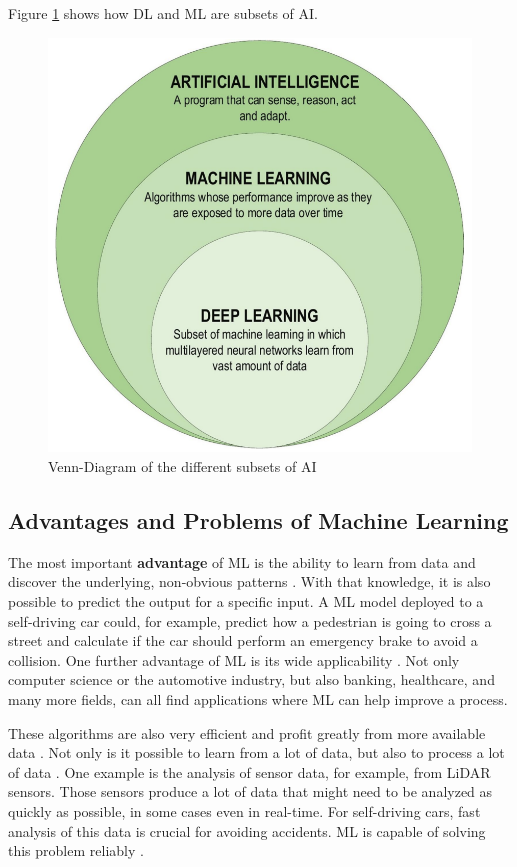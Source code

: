 Figure \ref{fig:AIMLDL} shows how DL and ML are subsets of AI. 

\begin{figure}[H]
	\centering
	\includegraphics[width=0.7\linewidth]{IMGs/AIMLDL.png}
	\caption{Venn-Diagram of the different subsets of AI \cite{Alzubaidi}}
	\label{fig:AIMLDL}
\end{figure}
\newpage
\subsection{Advantages and Problems of Machine Learning}\label{Advantages and Problems of Machine Learning}
The most important \textbf{advantage} of ML is the ability to learn from data and discover the underlying, non-obvious patterns \cite{Wuest}. With that knowledge, it is also possible to predict the output for a specific input. A ML model deployed to a self-driving car could, for example, predict how a pedestrian is going to cross a street and calculate if the car should perform an emergency brake to avoid a collision. One further advantage of ML is its wide applicability \cite{Thommandru}. Not only computer science or the automotive industry, but also banking, healthcare, and many more fields, can all find applications where ML can help improve a process.

These algorithms are also very efficient and profit greatly from more available data \cite{Janiesch}. Not only is it possible to learn from a lot of data, but also to process a lot of data \cite{Wuest}. One example is the analysis of sensor data, for example, from LiDAR sensors. Those sensors produce a lot of data that might need to be analyzed as quickly as possible, in some cases even in real-time. For self-driving cars, fast analysis of this data is crucial for avoiding accidents. ML is capable of solving this problem reliably \cite{Lyu}. 

